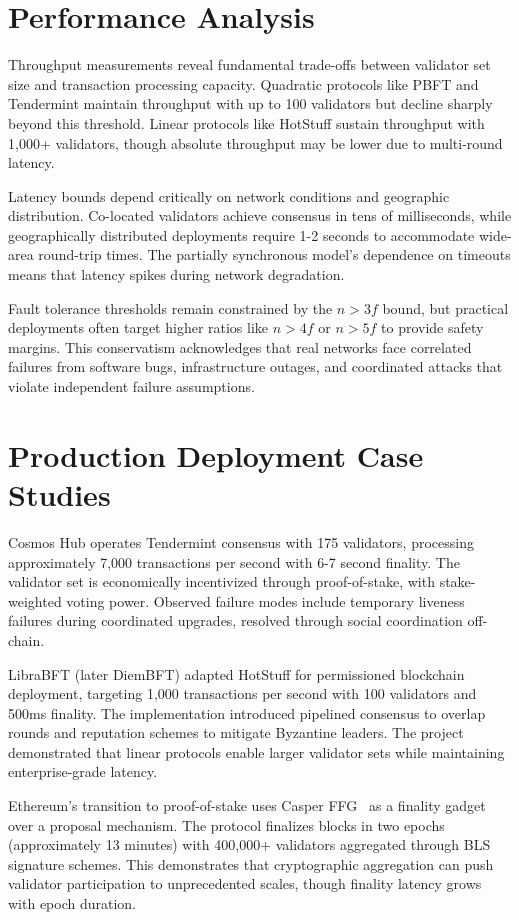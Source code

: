 \documentclass{article}
\begin{document}
\section{Performance Analysis}

Throughput measurements reveal fundamental trade-offs between validator set size and transaction processing capacity. Quadratic protocols like PBFT and Tendermint maintain throughput with up to 100 validators but decline sharply beyond this threshold. Linear protocols like HotStuff sustain throughput with 1,000+ validators, though absolute throughput may be lower due to multi-round latency.

Latency bounds depend critically on network conditions and geographic distribution. Co-located validators achieve consensus in tens of milliseconds, while geographically distributed deployments require 1-2 seconds to accommodate wide-area round-trip times. The partially synchronous model's dependence on timeouts means that latency spikes during network degradation.

Fault tolerance thresholds remain constrained by the $n > 3f$ bound, but practical deployments often target higher ratios like $n > 4f$ or $n > 5f$ to provide safety margins. This conservatism acknowledges that real networks face correlated failures from software bugs, infrastructure outages, and coordinated attacks that violate independent failure assumptions.

\section{Production Deployment Case Studies}

Cosmos Hub operates Tendermint consensus with 175 validators, processing approximately 7,000 transactions per second with 6-7 second finality. The validator set is economically incentivized through proof-of-stake, with stake-weighted voting power. Observed failure modes include temporary liveness failures during coordinated upgrades, resolved through social coordination off-chain.

LibraBFT (later DiemBFT) adapted HotStuff for permissioned blockchain deployment, targeting 1,000 transactions per second with 100 validators and 500ms finality. The implementation introduced pipelined consensus to overlap rounds and reputation schemes to mitigate Byzantine leaders. The project demonstrated that linear protocols enable larger validator sets while maintaining enterprise-grade latency.

Ethereum's transition to proof-of-stake uses Casper FFG~\cite{buterin2020combining} as a finality gadget over a proposal mechanism. The protocol finalizes blocks in two epochs (approximately 13 minutes) with 400,000+ validators aggregated through BLS signature schemes. This demonstrates that cryptographic aggregation can push validator participation to unprecedented scales, though finality latency grows with epoch duration.
\end{document}
